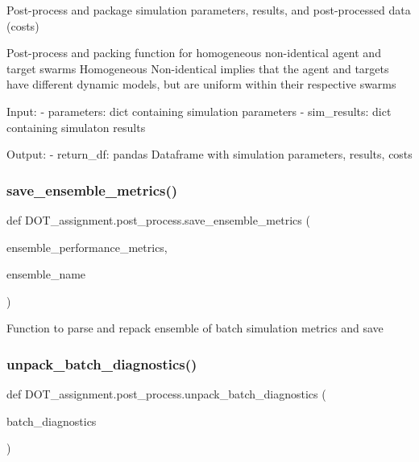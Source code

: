 \begin{DoxyVerb}Post-process and package simulation parameters, results, and post-processed data (costs)

Post-process and packing function for homogeneous non-identical agent and target swarms
Homogeneous Non-identical implies that the agent and targets have different dynamic models, but are uniform
within their respective swarms

Input:
- parameters:           dict containing simulation parameters
- sim_results:          dict containing simulaton results

Output:
- return_df:            pandas Dataframe with simulation parameters, results, costs\end{DoxyVerb}
 \mbox{\label{namespace_d_o_t__assignment_1_1post__process_afaad9e32ef7dcf3926653b2b0c076781}} 
\subsubsection{\texorpdfstring{save\_ensemble\_metrics()}{save\_ensemble\_metrics()}}
{\footnotesize\ttfamily def D\+O\+T\+\_\+assignment.\+post\+\_\+process.\+save\+\_\+ensemble\+\_\+metrics (\begin{DoxyParamCaption}\item[{}]{ensemble\+\_\+performance\+\_\+metrics,  }\item[{}]{ensemble\+\_\+name }\end{DoxyParamCaption})}

\begin{DoxyVerb}Function to parse and repack ensemble of batch simulation metrics and save
\end{DoxyVerb}
 \mbox{\label{namespace_d_o_t__assignment_1_1post__process_aa625e632ba6293d9db0884760ad1239c}} 
\subsubsection{\texorpdfstring{unpack\_batch\_diagnostics()}{unpack\_batch\_diagnostics()}}
{\footnotesize\ttfamily def D\+O\+T\+\_\+assignment.\+post\+\_\+process.\+unpack\+\_\+batch\+\_\+diagnostics (\begin{DoxyParamCaption}\item[{}]{batch\+\_\+diagnostics }\end{DoxyParamCaption})}

